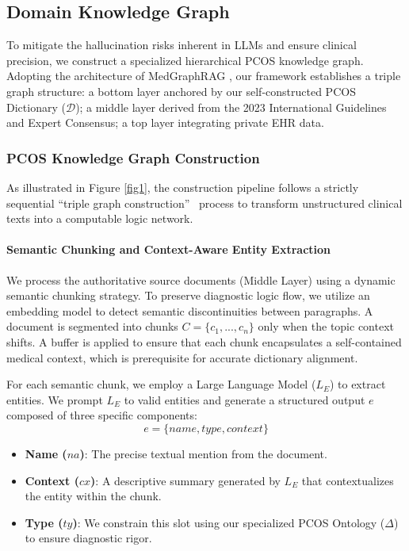 \documentclass[a4paper,fleqn]{cas-dc}
\begin{document}
\subsection{Domain Knowledge Graph}\label{knowledgegraph}
To mitigate the hallucination risks inherent in LLMs and ensure clinical precision, we construct a specialized hierarchical PCOS knowledge graph. Adopting the architecture of MedGraphRAG \cite{wu-etal-2025-medical}, our framework establishes a triple graph structure: a bottom layer anchored by our self-constructed PCOS Dictionary ($\mathcal{D}$); a middle layer derived from the 2023 International Guidelines and Expert Consensus; a top layer integrating private EHR data.

\subsubsection{PCOS Knowledge Graph Construction}
As illustrated in Figure \ref{fig1}, the construction pipeline follows a strictly sequential ``triple graph construction''~\cite{wu-etal-2025-medical} process to transform unstructured clinical texts into a computable logic network.

\paragraph{Semantic Chunking and Context-Aware Entity Extraction}
We process the authoritative source documents (Middle Layer) using a dynamic semantic chunking strategy. To preserve diagnostic logic flow, we utilize an embedding model to detect semantic discontinuities between paragraphs. A document is segmented into chunks $C = \{c_1, ..., c_n\}$ only when the topic context shifts. A buffer is applied to ensure that each chunk encapsulates a self-contained medical context, which is prerequisite for accurate dictionary alignment.

For each semantic chunk, we employ a Large Language Model ($L_E$) to extract entities. We prompt $L_E$ to valid entities and generate a structured output $e$ composed of three specific components:
\begin{equation}
e = \{name, type, context\}
\end{equation}
\begin{itemize}
    \item \textbf{Name ($na$)}: The precise textual mention from the document.
    \item \textbf{Context ($cx$)}: A descriptive summary generated by $L_E$ that contextualizes the entity within the chunk.
    \item \textbf{Type ($ty$)}: We constrain this slot using our specialized PCOS Ontology ($\Delta$) to ensure diagnostic rigor.  
\end{itemize}
    
\end{document}
